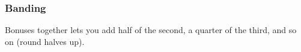 \subsubsection{Banding}
Bonuses together lets you add half of the second, a quarter of the third, and so on
(round halves up).


